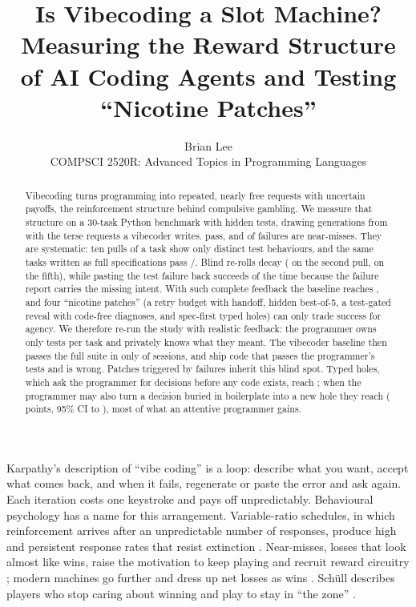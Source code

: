 \documentclass[10pt,twocolumn]{article}
\title{\vspace{-1.6em}\textbf{Is Vibecoding a Slot Machine?}\\[2pt]
\large Measuring the Reward Structure of AI Coding Agents and Testing ``Nicotine Patches''}
\author{Brian Lee\\ \small COMPSCI 2520R: Advanced Topics in Programming Languages}
\date{\vspace{-1.2em}}
\makeatletter
\renewcommand\section{\@startsection{section}{1}{\z@}{-1.5ex plus -.4ex minus -.2ex}{0.7ex plus .2ex}{\normalfont\large\bfseries\raggedright}}
\makeatother
\begin{document}
\maketitle

\begin{abstract}
\noindent
Vibecoding turns programming into repeated, nearly free requests with uncertain payoffs, the reinforcement
structure behind compulsive gambling. We measure that structure on a 30-task Python benchmark with
\NTests{} hidden tests, drawing \VibeN{} generations from \Model{} with the terse requests a vibecoder
writes. \VibePassRate{} pass, and \NmGivenFail{} of failures are near-misses. They are systematic: ten pulls
of a task show only \DistinctBehaviours{} distinct test behaviours, and the same tasks written as full
specifications pass \SpecN/\SpecN. Blind re-rolls decay (\BlindHazTwo{} on the second pull, \BlindHazFive{} on
the fifth), while pasting the test failure back succeeds \EpHazTwo{} of the time because the failure report
carries the missing intent. With such complete feedback the baseline reaches \BasePass, and four
``nicotine patches'' (a retry budget with handoff, hidden best-of-5, a test-gated reveal with code-free
diagnoses, and spec-first typed holes) can only trade success for agency. We therefore re-run the study
with realistic feedback: the programmer owns only \NVisible{} tests per task and privately knows what they
meant. The vibecoder baseline then passes the full suite in only \RVibePass{} of sessions, and \RVibeSilent{}
ship code that passes the programmer's tests and is wrong. Patches triggered by failures inherit this blind
spot. Typed holes, which ask the programmer for decisions before any code exists, reach \RFourPass{}; when
the programmer may also turn a decision buried in boilerplate into a new hole they reach \RFourPlusPass{}
(\RFourPlusDelta{} points, 95\% CI \RFourPlusDeltaLo{} to \RFourPlusDeltaHi), most of what an attentive programmer
gains.
\end{abstract}

\section{Introduction}
Karpathy's description of ``vibe coding'' \citep{karpathy2025vibe} is a loop: describe what you want,
accept what comes back, and when it fails, regenerate or paste the error and ask again. Each iteration
costs one keystroke and pays off unpredictably. Behavioural psychology has a name for this arrangement.
Variable-ratio schedules, in which reinforcement arrives after an unpredictable number of responses,
produce high and persistent response rates that resist extinction \citep{ferster1957schedules}.
Near-misses, losses that look almost like wins, raise the motivation to keep playing
\citep{reid1986nearmiss} and recruit reward circuitry \citep{clark2009nearmiss}; modern machines go
further and dress up net losses as wins \citep{dixon2010ldw}. Sch\"ull describes players who stop caring about winning and play to stay in ``the zone''
\citep{schull2012addiction}.
\end{document}
